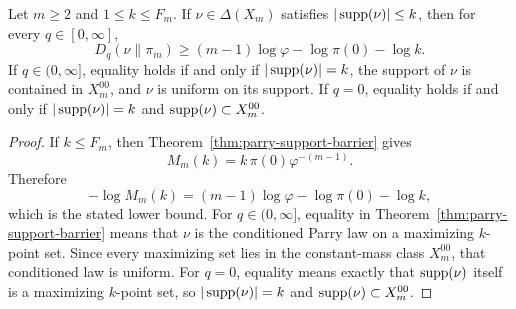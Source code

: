\begin{corollary}\label{cor:exact-complexity-divergence-law}
Let \(m\ge2\) and \(1\le k\le F_m\). If \(\nu\in\Delta(X_m)\) satisfies
\(|\operatorname{supp}(\nu)|\le k\), then for every \(q\in[0,\infty]\),
\[
D_q(\nu\|\pi_m)
\ge
(m-1)\log\varphi-\log\pi(0)-\log k.
\]
If \(q\in(0,\infty]\), equality holds if and only if \(|\operatorname{supp}(\nu)|=k\), the
support of \(\nu\) is contained in \(X_m^{00}\), and \(\nu\) is uniform on its
support. If \(q=0\), equality holds if and only if \(|\operatorname{supp}(\nu)|=k\) and
\(\operatorname{supp}(\nu)\subset X_m^{00}\).
\end{corollary}

\begin{proof}
If \(k\le F_m\), then Theorem~\ref{thm:parry-support-barrier} gives
\[
M_m(k)=k\,\pi(0)\varphi^{-(m-1)}.
\]
Therefore
\[
-\log M_m(k)
=(m-1)\log\varphi-\log\pi(0)-\log k,
\]
which is the stated lower bound. For \(q\in(0,\infty]\), equality in
Theorem~\ref{thm:parry-support-barrier} means that \(\nu\) is the conditioned
Parry law on a maximizing \(k\)-point set. Since every maximizing set lies in
the constant-mass class \(X_m^{00}\), that conditioned law is uniform. For
\(q=0\), equality means exactly that \(\operatorname{supp}(\nu)\) itself is a maximizing
\(k\)-point set, so \(|\operatorname{supp}(\nu)|=k\) and \(\operatorname{supp}(\nu)\subset X_m^{00}\).
\end{proof}

